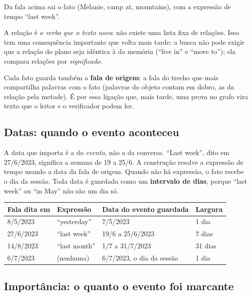 \documentclass[11pt]{article}
\newcommand{\rel}[1]{\textsf{#1}}
\begin{document}
\begin{exemplo}
Da fala acima sai o fato (Melanie, \rel{camp at}, mountains), com a expressão
de tempo ``last week''.
\end{exemplo}

A relação é \emph{o verbo que o texto usou}: não existe uma lista fixa de
relações. Isso tem uma consequência importante que volta mais tarde: a busca
não pode exigir que a relação do plano seja idêntica à da memória
(``live in'' e ``move to''); ela compara relações por \emph{significado}.

Cada fato guarda também a \textbf{fala de origem}: a fala do trecho que mais
compartilha palavras com o fato (palavras do objeto contam em dobro, as da
relação pela metade). É por essa ligação que, mais tarde, uma prova no grafo
vira texto que o leitor e o verificador podem ler.

\subsection{Datas: quando o evento aconteceu}

A data que importa é a do \emph{evento}, não a da conversa. ``Last week'',
dito em 27/6/2023, significa a semana de 19 a 25/6. A construção resolve a
expressão de tempo usando a data da fala de origem. Quando não há expressão,
o fato recebe o dia da sessão. Toda data é guardada como um
\textbf{intervalo de dias}, porque ``last week'' ou ``in May'' não são um dia só.

\begin{center}\small
\begin{tabular}{@{}llll@{}}
\toprule
Fala dita em & Expressão & Data do evento guardada & Largura \\
\midrule
8/5/2023 & ``yesterday'' & 7/5/2023 & 1 dia \\
27/6/2023 & ``last week'' & 19/6 a 25/6/2023 & 7 dias \\
14/8/2023 & ``last month'' & 1/7 a 31/7/2023 & 31 dias \\
6/7/2023 & (nenhuma) & 6/7/2023, o dia da sessão & 1 dia \\
\bottomrule
\end{tabular}
\end{center}

\subsection{Importância: o quanto o evento foi marcante}
\end{document}
